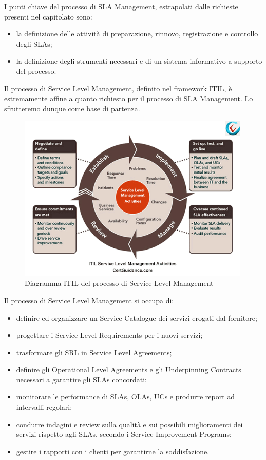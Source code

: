 I punti chiave del processo di SLA Management, estrapolati dalle richieste presenti nel capitolato sono:

\begin{itemize}
	\item la definizione delle attività di preparazione, rinnovo, registrazione e controllo degli SLAs;
    \item la definizione degli strumenti necessari e di un sistema informativo a supporto del processo.
\end{itemize}

Il processo di Service Level Management, definito nel framework ITIL, è estremamente affine a quanto richiesto per il processo di SLA Management. Lo sfrutteremo dunque come base di partenza.

\begin{figure}[H]
\centering
\includegraphics[width=30em]{immagini/sla/slmdiagram.png}
\caption{Diagramma ITIL del processo di Service Level Management}
\end{figure}

Il processo di Service Level Management si occupa di:

\begin{itemize}
	\item definire ed organizzare un Service Catalogue dei servizi erogati dal fornitore;
	\item progettare i Service Level Requirements per i nuovi servizi;
    \item trasformare gli SRL in Service Level Agreements;
    \item definire gli Operational Level Agreements e gli Underpinning Contracts necessari a garantire gli SLAs concordati;
    \item monitorare le performance di SLAs, OLAs, UCs e produrre report ad intervalli regolari;
    \item condurre indagini e review sulla qualità e sui possibili miglioramenti dei servizi rispetto agli SLAs, secondo i Service Improvement Programs;
    \item gestire i rapporti con i clienti per garantirne la soddisfazione.
\end{itemize}

